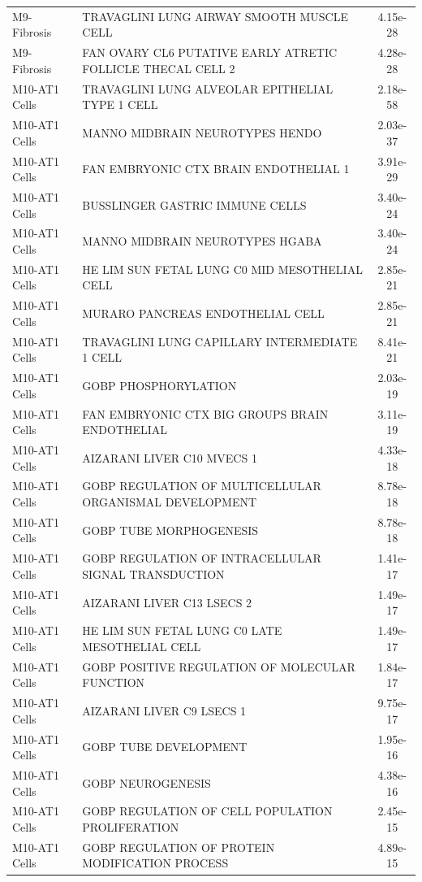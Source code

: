\documentclass[
]{article}
\begin{document}
\begin{singlespace}
\begin{longtable}[t]{>{\raggedright\arraybackslash}p{1.4in}>{\raggedright\arraybackslash}p{4.5in}c}
M9-Fibrosis & TRAVAGLINI LUNG AIRWAY SMOOTH MUSCLE CELL & 4.15e-28\\
M9-Fibrosis & FAN OVARY CL6 PUTATIVE EARLY ATRETIC FOLLICLE THECAL CELL 2 & 4.28e-28\\
\addlinespace
M10-AT1 Cells & TRAVAGLINI LUNG ALVEOLAR EPITHELIAL TYPE 1 CELL & 2.18e-58\\
M10-AT1 Cells & MANNO MIDBRAIN NEUROTYPES HENDO & 2.03e-37\\
M10-AT1 Cells & FAN EMBRYONIC CTX BRAIN ENDOTHELIAL 1 & 3.91e-29\\
M10-AT1 Cells & BUSSLINGER GASTRIC IMMUNE CELLS & 3.40e-24\\
M10-AT1 Cells & MANNO MIDBRAIN NEUROTYPES HGABA & 3.40e-24\\
\addlinespace
M10-AT1 Cells & HE LIM SUN FETAL LUNG C0 MID MESOTHELIAL CELL & 2.85e-21\\
M10-AT1 Cells & MURARO PANCREAS ENDOTHELIAL CELL & 2.85e-21\\
M10-AT1 Cells & TRAVAGLINI LUNG CAPILLARY INTERMEDIATE 1 CELL & 8.41e-21\\
M10-AT1 Cells & GOBP PHOSPHORYLATION & 2.03e-19\\
M10-AT1 Cells & FAN EMBRYONIC CTX BIG GROUPS BRAIN ENDOTHELIAL & 3.11e-19\\
\addlinespace
M10-AT1 Cells & AIZARANI LIVER C10 MVECS 1 & 4.33e-18\\
M10-AT1 Cells & GOBP REGULATION OF MULTICELLULAR ORGANISMAL DEVELOPMENT & 8.78e-18\\
M10-AT1 Cells & GOBP TUBE MORPHOGENESIS & 8.78e-18\\
M10-AT1 Cells & GOBP REGULATION OF INTRACELLULAR SIGNAL TRANSDUCTION & 1.41e-17\\
M10-AT1 Cells & AIZARANI LIVER C13 LSECS 2 & 1.49e-17\\
\addlinespace
M10-AT1 Cells & HE LIM SUN FETAL LUNG C0 LATE MESOTHELIAL CELL & 1.49e-17\\
M10-AT1 Cells & GOBP POSITIVE REGULATION OF MOLECULAR FUNCTION & 1.84e-17\\
M10-AT1 Cells & AIZARANI LIVER C9 LSECS 1 & 9.75e-17\\
M10-AT1 Cells & GOBP TUBE DEVELOPMENT & 1.95e-16\\
M10-AT1 Cells & GOBP NEUROGENESIS & 4.38e-16\\
\addlinespace
M10-AT1 Cells & GOBP REGULATION OF CELL POPULATION PROLIFERATION & 2.45e-15\\
M10-AT1 Cells & GOBP REGULATION OF PROTEIN MODIFICATION PROCESS & 4.89e-15\\

\end{longtable}
\end{singlespace}
\end{document}
